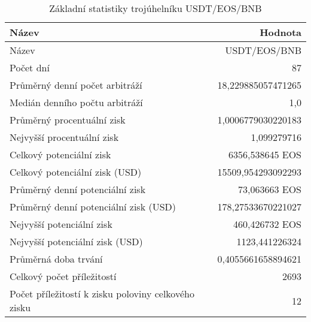 \begin{table}\centering
\caption{Základní statistiky trojúhelníku USDT/EOS/BNB}
\label{USDTEOSBNB_stats}
\begin{tabular}{|| l | r ||}
\hline Název & Hodnota \\ 
\hline\hline Název & USDT/EOS/BNB \\ 
\hline Počet dní & 87 \\ 
\hline Průměrný denní počet arbitráží & 18,229885057471265 \\ 
\hline Medián denního počtu arbitráží & 1,0 \\ 
\hline Průměrný procentuální zisk & 1,0006779030220183 \\ 
\hline Nejvyšší procentuální zisk & 1,099279716 \\ 
\hline Celkový potenciální zisk & 6356,538645 EOS \\ 
\hline Celkový potenciální zisk (USD) & 15509,954293092293 \\ 
\hline Průměrný denní potenciální zisk & 73,063663 EOS \\ 
\hline Průměrný denní potenciální zisk (USD) & 178,27533670221027 \\ 
\hline Nejvyšší potenciální zisk & 460,426732 EOS \\ 
\hline Nejvyšší potenciální zisk (USD) & 1123,441226324 \\ 
\hline Průměrná doba trvání & 0,4055661658894621 \\ 
\hline Celkový počet příležitostí & 2693 \\ 
\hline Počet příležitostí k zisku poloviny celkového zisku & 12 \\ 
\hline
\end{tabular}
\end{table}